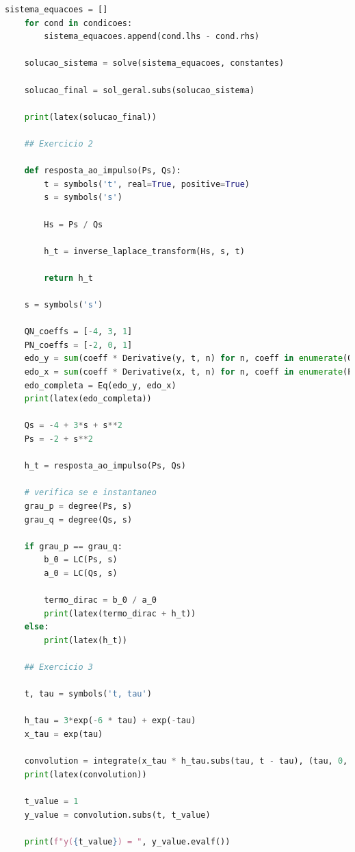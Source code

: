 \documentclass[12pt]{scrartcl}
\begin{document}
\begin{lstlisting}[language=Python, breaklines=true, basicstyle=\scriptsize]
    sistema_equacoes = []
    for cond in condicoes:
        sistema_equacoes.append(cond.lhs - cond.rhs)
    
    solucao_sistema = solve(sistema_equacoes, constantes)
    
    solucao_final = sol_geral.subs(solucao_sistema)
    
    print(latex(solucao_final))
    
    ## Exercicio 2
    
    def resposta_ao_impulso(Ps, Qs):
        t = symbols('t', real=True, positive=True)
        s = symbols('s')
    
        Hs = Ps / Qs
    
        h_t = inverse_laplace_transform(Hs, s, t)
    
        return h_t
    
    s = symbols('s')
    
    QN_coeffs = [-4, 3, 1]
    PN_coeffs = [-2, 0, 1]
    edo_y = sum(coeff * Derivative(y, t, n) for n, coeff in enumerate(QN_coeffs))
    edo_x = sum(coeff * Derivative(x, t, n) for n, coeff in enumerate(PN_coeffs))
    edo_completa = Eq(edo_y, edo_x)
    print(latex(edo_completa))
    
    Qs = -4 + 3*s + s**2
    Ps = -2 + s**2
    
    h_t = resposta_ao_impulso(Ps, Qs)
    
    # verifica se e instantaneo
    grau_p = degree(Ps, s)
    grau_q = degree(Qs, s)
    
    if grau_p == grau_q:
        b_0 = LC(Ps, s)
        a_0 = LC(Qs, s)
    
        termo_dirac = b_0 / a_0
        print(latex(termo_dirac + h_t))
    else:
        print(latex(h_t))
    
    ## Exercicio 3
    
    t, tau = symbols('t, tau')
    
    h_tau = 3*exp(-6 * tau) + exp(-tau)
    x_tau = exp(tau)
    
    convolution = integrate(x_tau * h_tau.subs(tau, t - tau), (tau, 0, t))
    print(latex(convolution))
    
    t_value = 1
    y_value = convolution.subs(t, t_value)
    
    print(f"y({t_value}) = ", y_value.evalf())
\end{lstlisting}
\end{document}
